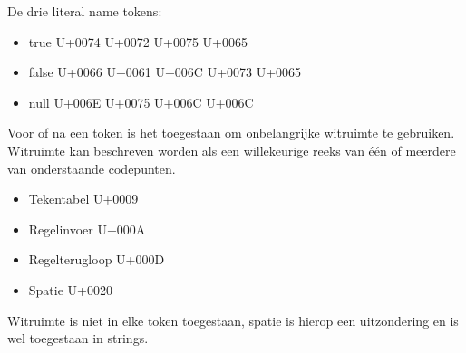 De drie literal name tokens:

\begin{itemize}
    \item true  U+0074 U+0072 U+0075 U+0065
    \item false U+0066 U+0061 U+006C U+0073 U+0065
    \item null  U+006E U+0075 U+006C U+006C 
\end{itemize}

Voor of na een token is het toegestaan om onbelangrijke witruimte te gebruiken. Witruimte kan beschreven worden als een willekeurige reeks van één of meerdere van onderstaande codepunten.

\begin{itemize}
    \item Tekentabel        U+0009
    \item Regelinvoer       U+000A
    \item Regelterugloop    U+000D
    \item Spatie            U+0020
\end{itemize}

Witruimte is niet in elke token toegestaan, spatie is hierop een uitzondering en is wel toegestaan in strings.




